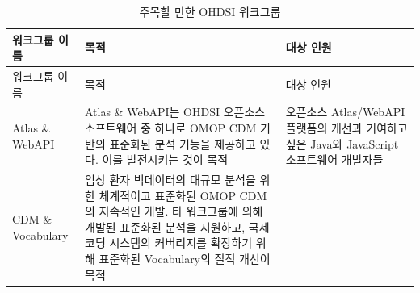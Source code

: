 \documentclass[10.5pt]{book}
\theoremstyle{definition}
\theoremstyle{definition}
\theoremstyle{definition}
\theoremstyle{remark}
\begin{document}
\begin{longtable}[]{@{}lll@{}}
\caption{\label{tab:OHDSIworkgroups} 주목할 만한 OHDSI
워크그룹}\tabularnewline
\toprule
\begin{minipage}[b]{0.11\columnwidth}\raggedright\strut
워크그룹 이름\strut
\end{minipage} & \begin{minipage}[b]{0.44\columnwidth}\raggedright\strut
목적\strut
\end{minipage} & \begin{minipage}[b]{0.37\columnwidth}\raggedright\strut
대상 인원\strut
\end{minipage}\tabularnewline
\midrule
\endfirsthead
\toprule
\begin{minipage}[b]{0.11\columnwidth}\raggedright\strut
워크그룹 이름\strut
\end{minipage} & \begin{minipage}[b]{0.44\columnwidth}\raggedright\strut
목적\strut
\end{minipage} & \begin{minipage}[b]{0.37\columnwidth}\raggedright\strut
대상 인원\strut
\end{minipage}\tabularnewline
\midrule
\endhead
\begin{minipage}[t]{0.11\columnwidth}\raggedright\strut
Atlas \& WebAPI\strut
\end{minipage} & \begin{minipage}[t]{0.44\columnwidth}\raggedright\strut
Atlas \& WebAPI는 OHDSI 오픈소스 소프트웨어 중 하나로 OMOP CDM 기반의
표준화된 분석 기능을 제공하고 있다. 이를 발전시키는 것이 목적\strut
\end{minipage} & \begin{minipage}[t]{0.37\columnwidth}\raggedright\strut
오픈소스 Atlas/WebAPI 플랫폼의 개선과 기여하고 싶은 Java와 JavaScript
소프트웨어 개발자들\strut
\end{minipage}\tabularnewline
\begin{minipage}[t]{0.11\columnwidth}\raggedright\strut
CDM \& Vocabulary\strut
\end{minipage} & \begin{minipage}[t]{0.44\columnwidth}\raggedright\strut
임상 환자 빅데이터의 대규모 분석을 위한 체계적이고 표준화된 OMOP CDM의
지속적인 개발. 타 워크그룹에 의해 개발된 표준화된 분석을 지원하고, 국제
코딩 시스템의 커버리지를 확장하기 위해 표준화된 Vocabulary의 질적 개선이
목적\strut
\end{minipage} & \begin{minipage}[t]{0.37\columnwidth}\raggedright\strut

\end{minipage}
\end{longtable}
\end{document}
